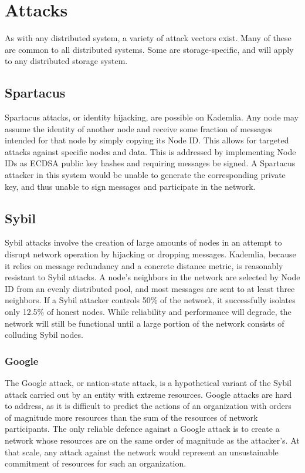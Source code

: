 \documentclass[a4paper,10pt]{article}
\begin{document}
\section{Attacks}
As with any distributed system, a variety of attack vectors exist. Many of these are common to all distributed systems. Some are storage-specific, and will apply to any distributed storage system.

\subsection{Spartacus}
Spartacus attacks, or identity hijacking, are possible on Kademlia. Any node may assume the identity of another node and receive some fraction of messages intended for that node by simply copying its Node ID. This allows for targeted attacks against specific nodes and data. This is addressed by implementing Node IDs as ECDSA public key hashes and requiring messages be signed. A Spartacus attacker in this system would be unable to generate the corresponding private key, and thus unable to sign messages and participate in the network.

\subsection{Sybil}

Sybil attacks involve the creation of large amounts of nodes in an attempt to disrupt network operation by hijacking or dropping messages. Kademlia, because it relies on message redundancy and a concrete distance metric, is reasonably resistant to Sybil attacks. A node’s neighbors in the network are selected by Node ID from an evenly distributed pool, and most messages are sent to at least three neighbors. If a Sybil attacker controls 50\% of the network, it successfully isolates only 12.5\% of honest nodes. While reliability and performance will degrade, the network will still be functional until a large portion of the network consists of colluding Sybil nodes.

\subsubsection{Google}
The Google attack, or nation-state attack, is a hypothetical variant of the Sybil attack carried out by an entity with extreme resources. Google attacks are hard to address, as it is difficult to predict the actions of an organization with orders of magnitude more resources than the sum of the resources of network participants. The only reliable defence against a Google attack is to create a network whose resources are on the same order of magnitude as the attacker’s. At that scale, any attack against the network would represent an unsustainable commitment of resources for such an organization.
\end{document}
